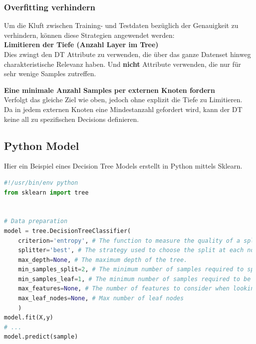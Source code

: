 \newpage
\subsubsection{Overfitting verhindern}

Um die Kluft zwischen Training- und Testdaten bezüglich der Genauigkeit zu verhindern, können diese Strategien angewendet werden: \\

\textbf{Limitieren der Tiefe (Anzahl Layer im Tree)}\\
Dies zwingt den DT Attribute zu verwenden, die über das ganze Datenset hinweg charakteristische Relevanz haben. Und \textbf{nicht} Attribute verwenden, die nur für sehr wenige Samples zutreffen.



\textbf{Eine minimale Anzahl Samples per externen Knoten fordern}\\
Verfolgt das gleiche Ziel wie oben, jedoch ohne explizit die Tiefe zu Limitieren. Da in jedem externen Knoten eine Mindestanzahl gefordert wird, kann der DT keine all zu spezifischen Decisions definieren.



\subsection{Python Model}

Hier ein Beispiel eines Decision Tree Models erstellt in Python mittels Sklearn.

\begin{lstlisting}[language=Python]
#!/usr/bin/env python
from sklearn import tree


# Data preparation
model = tree.DecisionTreeClassifier(
	criterion='entropy', # The function to measure the quality of a split. ('gini' or 'entropy')
	splitter='best', # The strategy used to choose the split at each node. ('best' or 'random')
	max_depth=None, # The maximum depth of the tree.
	min_samples_split=2, # The minimum number of samples required to split an internal node
	min_samples_leaf=1, # The minimum number of samples required to be at a leaf node.
	max_features=None, # The number of features to consider when looking for the best split
	max_leaf_nodes=None, # Max number of leaf nodes
	)
model.fit(X,y)
# ...
model.predict(sample)

\end{lstlisting}





